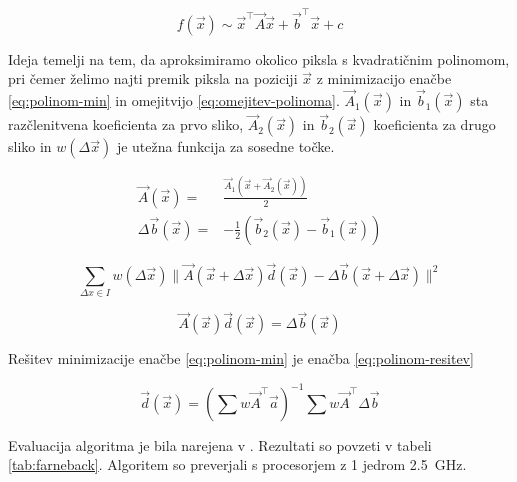 \begin{equation}\label{eq:polinom}
	f(\vec{x}) \sim \vec{x}^\top \vec{A} \vec{x} + \vec{b}^\top \vec{x} + c
\end{equation}

Ideja temelji na tem, da aproksimiramo okolico piksla s kvadratičnim polinomom, pri čemer želimo najti premik piksla na poziciji $\vec{x}$ z minimizacijo enačbe \eqref{eq:polinom-min} in omejitvijo \eqref{eq:omejitev-polinoma}. $\vec{A}_1(\vec{x})$ in $\vec{b}_1(\vec{x})$ sta razčlenitvena koeficienta za prvo sliko, $\vec{A}_2(\vec{x})$ in $\vec{b}_2(\vec{x})$ koeficienta za drugo sliko in $w(\Delta\vec{x})$ je utežna funkcija za sosedne točke.

\begin{align}
\vec{A}(\vec{x}) = & \frac{\vec{A}_1(\vec{x} + \vec{A}_2(\vec{x}))}{2} \\
\Delta\vec{b}(\vec{x}) = & - \frac{1}{2}\left(\vec{b}_2(\vec{x}) - \vec{b}_1(\vec{x})\right) 
\end{align}

\begin{equation}\label{eq:polinom-min}
\sum_{\Delta x \in I} w(\Delta\vec{x}) \| \vec{A}(\vec{x} + \Delta\vec{x})\vec{d}(\vec{x}) - \Delta\vec{b}(\vec{x} +\Delta\vec{x}) \|^2
\end{equation}

\begin{equation}\label{eq:omejitev-polinoma}
\vec{A}(\vec{x})\vec{d}(\vec{x}) = \Delta\vec{b}(\vec{x})
\end{equation}

Rešitev minimizacije enačbe \eqref{eq:polinom-min} je enačba \eqref{eq:polinom-resitev}

\begin{equation}\label{eq:polinom-resitev}
 \vec{d}(\vec{x}) = \left( \sum w \vec{A}^\top \vec{a} \right)^{-1} \sum w \vec{A}^\top \Delta\vec{b}
\end{equation}

Evaluacija algoritma je bila narejena v \cite{Geiger2012CVPR}. Rezultati so povzeti v tabeli \ref{tab:farneback}. Algoritem so preverjali s procesorjem z 1 jedrom \@ \SI{2.5}{GHz}.

